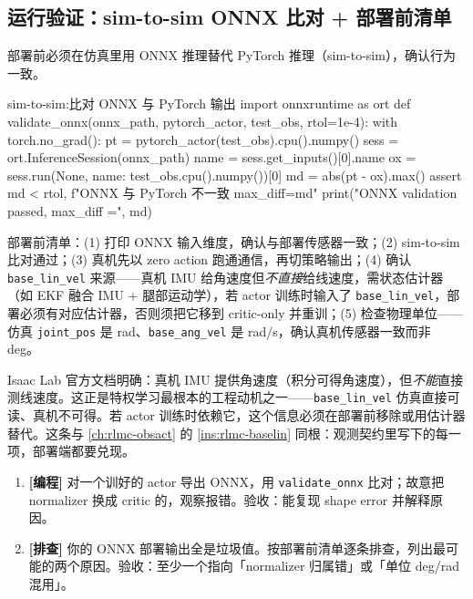 \subsection{运行验证：sim-to-sim ONNX 比对 + 部署前清单}
\label{sec:rlmc-priv-sim2sim}

部署前必须在仿真里用 ONNX 推理替代 PyTorch 推理（sim-to-sim），确认行为一致。

\begin{codebox}[Python]{sim-to-sim:比对 ONNX 与 PyTorch 输出}
import onnxruntime as ort
def validate_onnx(onnx_path, pytorch_actor, test_obs, rtol=1e-4):
    with torch.no_grad():
        pt = pytorch_actor(test_obs).cpu().numpy()
    sess = ort.InferenceSession(onnx_path)
    name = sess.get_inputs()[0].name
    ox = sess.run(None, {name: test_obs.cpu().numpy()})[0]
    md = abs(pt - ox).max()
    assert md < rtol, f"ONNX 与 PyTorch 不一致 max_diff={md}"
    print("ONNX validation passed, max_diff =", md)
\end{codebox}

部署前清单：(1) 打印 ONNX 输入维度，确认与部署传感器一致；(2) sim-to-sim 比对通过；(3) 真机先以 zero action 跑通通信，再切策略输出；(4) 确认 \verb|base_lin_vel| 来源——真机 IMU 给角速度但\emph{不直接}给线速度，需状态估计器（如 EKF 融合 IMU + 腿部运动学），若 actor 训练时输入了 \verb|base_lin_vel|，部署必须有对应估计器，否则须把它移到 critic-only 并重训；(5) 检查物理单位——仿真 \verb|joint_pos| 是 rad、\verb|base_ang_vel| 是 rad/s，确认真机传感器一致而非 deg。

\begin{insight}\label{ins:rlmc-priv-baselin}
Isaac Lab 官方文档明确：真机 IMU 提供角速度（积分可得角速度），但\emph{不能}直接测线速度。这正是特权学习最根本的工程动机之一——\verb|base_lin_vel| 仿真直接可读、真机不可得。若 actor 训练时依赖它，这个信息必须在部署前移除或用估计器替代。这条与 \cref{ch:rlmc-obsact} 的 \cref{ins:rlmc-baselin} 同根：观测契约里写下的每一项，部署端都要兑现。
\end{insight}

\begin{practice}[本节练习]
\begin{enumerate}
  \item \textbf{[编程]} 对一个训好的 actor 导出 ONNX，用 \verb|validate_onnx| 比对；故意把 normalizer 换成 critic 的，观察报错。验收：能复现 shape error 并解释原因。
  \item \textbf{[排查]} 你的 ONNX 部署输出全是垃圾值。按部署前清单逐条排查，列出最可能的两个原因。验收：至少一个指向「normalizer 归属错」或「单位 deg/rad 混用」。
\end{enumerate}
\end{practice}

